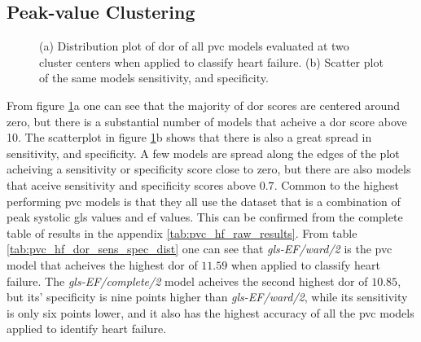 \newpage

\subsection{Peak-value Clustering}

\begin{figure}[htb]
    \centering
    
    \caption{(a) Distribution plot of \acrshort{dor} of all \acrshort{pvc} models evaluated at two cluster centers when applied to classify heart failure.
             (b) Scatter plot of the same models sensitivity, and specificity.}
    \label{fig:pvc_hf_dor_sens_spec_dist}
\end{figure}

From figure \ref{fig:pvc_hf_dor_sens_spec_dist}a one can see that the majority of \acrshort{dor} scores are centered around zero, but there is a substantial number of models that acheive a \acrshort{dor} score above 10. The scatterplot in figure \ref{fig:pvc_hf_dor_sens_spec_dist}b shows that there is also a great spread in sensitivity, and specificity. A few models are spread along the edges of the plot acheiving a sensitivity or specificity score close to zero, but there are also models that aceive sensitivity and specificity scores above $0.7$. Common to the highest performing \acrshort{pvc} models is that they all use the dataset that is a combination of peak systolic \acrshort{gls} values and \acrshort{ef} values. This can be confirmed from the complete table of results in the appendix \ref{tab:pvc_hf_raw_results}. From table \ref{tab:pvc_hf_dor_sens_spec_dist} one can see that \textit{gls-EF/ward/2} is the \acrshort{pvc} model that acheives the highest \acrshort{dor} of $11.59$ when applied to classify heart failure. The \textit{gls-EF/complete/2} model acheives the second highest \acrshort{dor} of $10.85$, but its' specificity is nine points higher than \textit{gls-EF/ward/2}, while its sensitivity is only six points lower, and it also has the highest accuracy of all the \acrshort{pvc} models applied to identify heart failure. \bigskip

